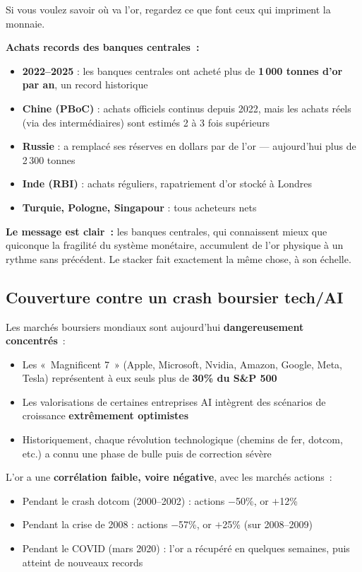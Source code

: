 \documentclass[14pt,a4paper]{extarticle}
\begin{document}
Si vous voulez savoir où va l'or, regardez ce que font ceux qui impriment la monnaie.

\textbf{Achats records des banques centrales~:}
\begin{itemize}
  \item \textbf{2022--2025} : les banques centrales ont acheté plus de \textbf{1\,000 tonnes d'or par an}, un record historique
  \item \textbf{Chine (PBoC)} : achats officiels continus depuis 2022, mais les achats réels (via des intermédiaires) sont estimés 2 à 3 fois supérieurs
  \item \textbf{Russie} : a remplacé ses réserves en dollars par de l'or --- aujourd'hui plus de 2\,300 tonnes
  \item \textbf{Inde (RBI)} : achats réguliers, rapatriement d'or stocké à Londres
  \item \textbf{Turquie, Pologne, Singapour} : tous acheteurs nets
\end{itemize}

\textbf{Le message est clair~:} les banques centrales, qui connaissent mieux que quiconque la fragilité du système monétaire, accumulent de l'or physique à un rythme sans précédent. Le stacker fait exactement la même chose, à son échelle.

\subsection{Couverture contre un crash boursier tech/AI}

Les marchés boursiers mondiaux sont aujourd'hui \textbf{dangereusement concentrés}~:

\begin{itemize}
  \item Les «~Magnificent 7~» (Apple, Microsoft, Nvidia, Amazon, Google, Meta, Tesla) représentent à eux seuls plus de \textbf{30\% du S\&P 500}
  \item Les valorisations de certaines entreprises AI intègrent des scénarios de croissance \textbf{extrêmement optimistes}
  \item Historiquement, chaque révolution technologique (chemins de fer, dotcom, etc.) a connu une phase de bulle puis de correction sévère
\end{itemize}

L'or a une \textbf{corrélation faible, voire négative}, avec les marchés actions~:
\begin{itemize}
  \item Pendant le crash dotcom (2000--2002) : actions $-$50\%, or $+$12\%
  \item Pendant la crise de 2008 : actions $-$57\%, or $+$25\% (sur 2008--2009)
  \item Pendant le COVID (mars 2020) : l'or a récupéré en quelques semaines, puis atteint de nouveaux records
\end{itemize}
\end{document}
